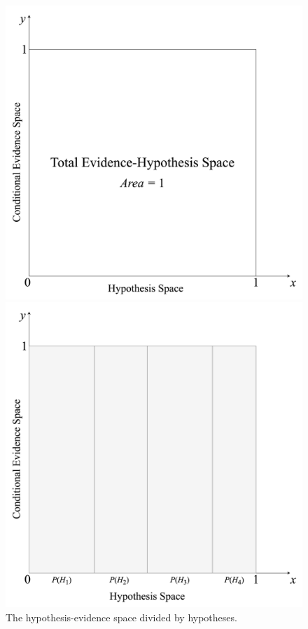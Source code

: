 \documentclass[12pt]{article}
\begin{document}
\begin{figure}[h!]
    \centering
    \begin{minipage}{0.50\textwidth}
        \centering
        \includegraphics[width=\textwidth]{assets/visual_3.png}
    \end{minipage}\hfill
    \begin{minipage}{0.50\textwidth}
        \centering
        \includegraphics[width=\textwidth]{assets/visual_4.png}
    \end{minipage}
    \caption{The hypothesis-evidence space divided by hypotheses.}
    \label{fig:both_visuals_3_4}
\end{figure}
\end{document}
